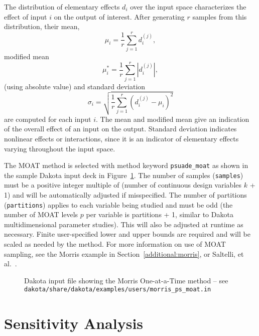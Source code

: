 The distribution of elementary effects $d_i$ over the input space
characterizes the effect of input $i$ on the output of interest.
After generating $r$ samples from this distribution, their mean,
\begin{equation}
\mu_i = \frac{1}{r}\sum_{j=1}^{r}{d_i^{(j)}},
\end{equation}
modified mean
\begin{equation}
\mu_i^* = \frac{1}{r}\sum_{j=1}^{r}{|d_i^{(j)}|},
\end{equation}
(using absolute value) and standard deviation
\begin{equation}
\sigma_i = \sqrt{ \frac{1}{r}\sum_{j=1}^{r}{ \left(d_i^{(j)} - \mu_i
\right)^2} }
\end{equation}
are computed for each input $i$. The mean and modified mean give an
indication of the overall effect of an input on the output. Standard
deviation indicates nonlinear effects or interactions, since it is an
indicator of elementary effects varying throughout the input space.

The MOAT method is selected with method keyword {\tt psuade\_moat} as
shown in the sample Dakota input deck in Figure~\ref{FIG:moat_input}.
The number of samples ({\tt samples}) must be a positive integer
multiple of (number of continuous design variables $k$ + 1) and will
be automatically adjusted if misspecified. The number of partitions
({\tt partitions}) applies to each variable being studied and must be
odd (the number of MOAT levels $p$ per variable is partitions + 1,
similar to Dakota multidimensional parameter studies). This will also
be adjusted at runtime as necessary. Finite user-specified lower and
upper bounds are required and will be scaled as needed by the method.
For more information on use of MOAT sampling, see the Morris example
in Section~\ref{additional:morris}, or Saltelli, et al.~\cite{Sal04}.

\begin{figure}
  \centering \begin{bigbox} \begin{small}
   \end{small} \end{bigbox}
\caption{Dakota input file showing the Morris One-at-a-Time method --
see {\tt dakota/share/dakota/examples/users/morris\_ps\_moat.in} }
\label{FIG:moat_input}
\end{figure}

\section{Sensitivity Analysis}\label{dace:sa}

